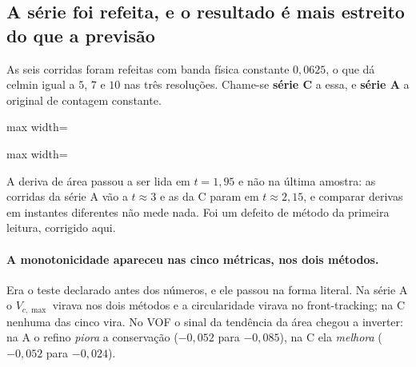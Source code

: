 \subsection{A s\'erie foi refeita, e o resultado \'e mais estreito do que a
previs\~ao}
\label{sec:conv-serieC}

As seis corridas foram refeitas com banda f\'isica constante $0{,}0625$, o que
d\'a $\text{celmin}$ igual a $5$, $7$ e $10$ nas tr\^es resolu\c{c}\~oes. Chame-se
\textbf{s\'erie C} a essa, e \textbf{s\'erie A} a original de contagem constante.

\begin{adjustbox}{max width=\linewidth}
\end{adjustbox}

\begin{adjustbox}{max width=\linewidth}
\end{adjustbox}

A deriva de \'area passou a ser lida em $t=1{,}95$ e n\~ao na \'ultima amostra:
as corridas da s\'erie A v\~ao a $t\approx3$ e as da C param em $t\approx2{,}15$,
e comparar derivas em instantes diferentes n\~ao mede nada. Foi um defeito de
m\'etodo da primeira leitura, corrigido aqui.

\paragraph{A monotonicidade apareceu nas cinco m\'etricas, nos dois m\'etodos.}
Era o teste declarado antes dos n\'umeros, e ele passou na forma literal. Na
s\'erie A o $V_{c,\max}$ virava nos dois m\'etodos e a circularidade virava no
front-tracking; na C nenhuma das cinco vira. No VOF o sinal da tend\^encia da
\'area chegou a inverter: na A o refino \emph{piora} a conserva\c{c}\~ao
($-0{,}052$ para $-0{,}085$), na C ela \emph{melhora} ($-0{,}052$ para
$-0{,}024$).

